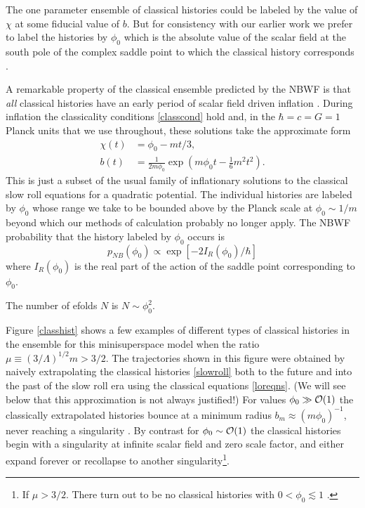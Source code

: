 \documentclass[prd,floats,superscriptaddress,eqsecnum,floatfix,nofootinbib,12pt]{revtex4}
\def\p0{\phi_0}
\def\be{\begin{equation}}
\def\ee{\end{equation}}
\def\zf{}
\def\j2{}
\def\tf{}
\def\nf{}
\def\p0{\phi_0}
\begin{document}
The one parameter ensemble of classical histories could be labeled by the value of $\chi$ at some fiducial value of $b$.  But for consistency with our earlier work we prefer to label the histories by $\p0$ which is the absolute value of the scalar field at the south pole of the complex saddle point to which the classical history corresponds \cite{HHH08a}. {\zf A remarkable property of the classical ensemble predicted by the NBWF is that 
{\it all} classical histories have an early period of scalar field driven inflation \cite{HHH08b,Lyo92}. During inflation the classicality conditions \eqref{classcond} hold and, in the $\hbar=c=G=1$ Planck units that we use throughout,  these solutions take the {\j2 approximate} form
\begin{subequations}
\label{slowroll}
\begin{align}
\chi(t) & = \p0 -mt/3 , \\
b(t)&= \frac{1}{2m\p0}\exp\left(m\p0 t -\frac{1}{6}m^2 t^2\right) .
\label{slwroll}
\end{align}
\end{subequations}
This is just a subset of the usual family of inflationary solutions to the classical slow roll equations for a quadratic potential.
The individual histories are labeled by $\p0$ whose range we take to be bounded above by the Planck scale at $\p0\sim 1/m$ {\tf beyond which our methods of calculation probably no longer apply}. {\j2 The NBWF probability that the history labeled by $\p0$ occurs is
\be
\label{nbprob}
p_{NB}(\p0) \propto \exp[-2I_R(\p0)/\hbar]
\ee
where $I_R(\p0)$ is the real part  of the action of the saddle point corresponding to $\p0$. }


The number of efolds $N$ is  $N \sim \p0^2$. {\zf Figure \ref{classhist} shows a few examples of different types of classical histories in the ensemble for this minisuperspace model when the ratio $\mu \equiv (3/\Lambda)^{1/2}m >3/2$. The trajectories shown in this figure were obtained by naively extrapolating the classical histories \eqref{slowroll} both to the future and into the past of the slow roll era using the classical equations \eqref{loreqns}. {\nf (We will see below that this approximation is not always justified!)} For values $\p0 \gg {\cal O}(1)$ the classically extrapolated histories bounce at a minimum radius $b_m \approx  (m \p0)^{-1}$, never reaching a singularity \cite{HHH08a}. By contrast for $\p0 \sim {\cal O}(1)$ the classical histories begin with a singularity at infinite scalar field and zero scale factor, and either expand forever or recollapse to another singularity\footnote{ \tf If $\mu>3/2$. There turn out to be  no classical histories with $0<\p0 \lesssim 1$ \cite{HHH08b}.}.

}}
\end{document}
